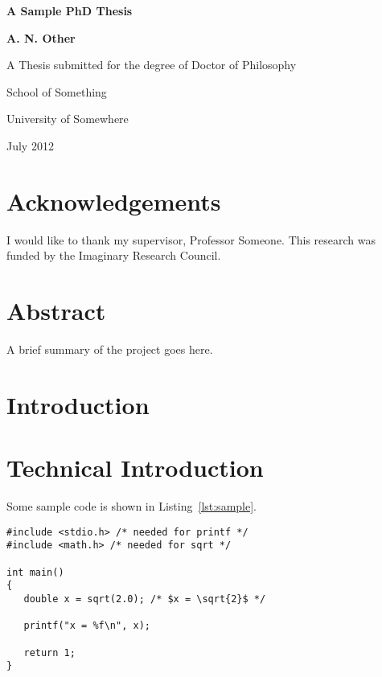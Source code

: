 \documentclass[oneside,12pt]{scrbook}
\begin{document}
\begin{titlepage}
\centering
\vspace*{1in}
\begin{Large}\bfseries
A Sample PhD Thesis\par
\end{Large}
\vspace{1.5in}
\begin{large}\bfseries
A. N. Other\par
\end{large}
\vfill
A Thesis submitted for the degree of Doctor of Philosophy
\par
\vspace{0.5in}
School of Something
\par
University of Somewhere
\par
\vspace{0.5in}
July 2012
\par
\end{titlepage}

\doublespacing

\frontmatter
\tableofcontents
\listoffigures
\listoftables
\lstlistoflistings

\chapter{Acknowledgements}

I would like to thank my supervisor, Professor Someone. This
research was funded by the Imaginary Research Council.

\chapter{Abstract}

A brief summary of the project goes here.

\mainmatter

\chapter{Introduction}
\label{ch:intro}

\lipsum

\chapter{Technical Introduction}
\label{ch:techintro}

Some sample code is shown in Listing~\ref{lst:sample}.

\begin{lstlisting}[mathescape=true,caption={Sample},label={lst:sample}]
#include <stdio.h> /* needed for printf */
#include <math.h> /* needed for sqrt */

int main()
{
   double x = sqrt(2.0); /* $x = \sqrt{2}$ */

   printf("x = %f\n", x);

   return 1;
}
\end{lstlisting} 
\end{document}

